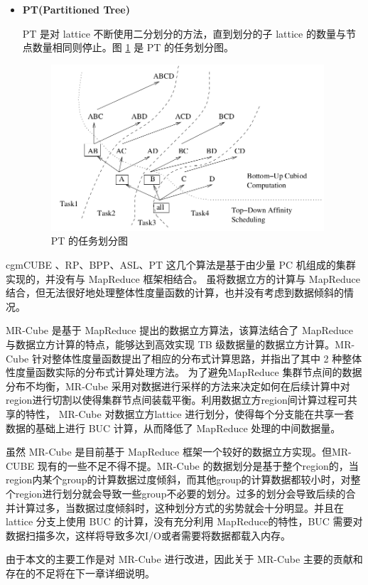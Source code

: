 \begin{itemize}
\item \textbf{PT(Partitioned Tree)}

PT 是对 lattice 不断使用二分划分的方法，直到划分的子 lattice 的数量与节点数量相同则停止。图 \ref{cluster_pt} 是 PT 的任务划分图。

\begin{figure}[!htb]
\centering\includegraphics[width=4in]{picture/ch_current_research/cluster_pt} 
\caption{PT 的任务划分图}\label{cluster_pt} 
\end{figure} 

\end{itemize}


cgmCUBE \cite{dehne2006cgmcube}、RP、BPP、ASL、PT\cite{lee2012efficient} 这几个算法是基于由少量 PC 机组成的集群实现的，并没有与 MapReduce 框架相结合。 \cite{you2008parallel} \cite{sergey2009applying} 虽将数据立方的计算与 MapReduce结合，但无法很好地处理整体性度量函数的计算，也并没有考虑到数据倾斜的情况。

MR-Cube \cite{nandi2011distributed} 是基于 MapReduce 提出的数据立方算法，该算法结合了 MapReduce 与数据立方计算的特点，能够达到高效实现 TB 级数据量的数据立方计算。MR-Cube 针对整体性度量函数提出了相应的分布式计算思路，并指出了其中 2 种整体性度量函数实际的分布式计算处理方法。 为了避免MapReduce 集群节点间的数据分布不均衡，MR-Cube 采用对数据进行采样的方法来决定如何在后续计算中对region进行切割以使得集群节点间装载平衡。利用数据立方region间计算过程可共享的特性， MR-Cube 对数据立方lattice 进行划分，使得每个分支能在共享一套数据的基础上进行 BUC 计算，从而降低了 MapReduce 处理的中间数据量。

虽然 MR-Cube 是目前基于 MapReduce 框架一个较好的数据立方实现。但MR-CUBE 现有的一些不足不得不提。MR-Cube 的数据划分是基于整个region的，当region内某个group的计算数据过度倾斜，而其他group的计算数据都较小时，对整个region进行划分就会导致一些group不必要的划分。过多的划分会导致后续的合并计算过多，当数据过度倾斜时，这种划分方式的劣势就会十分明显。并且在 lattice 分支上使用 BUC 的计算，没有充分利用 MapReduce的特性，BUC 需要对数据扫描多次，这样将导致多次I/O或者需要将数据都载入内存。

由于本文的主要工作是对 MR-Cube 进行改进，因此关于 MR-Cube 主要的贡献和存在的不足将在下一章详细说明。



